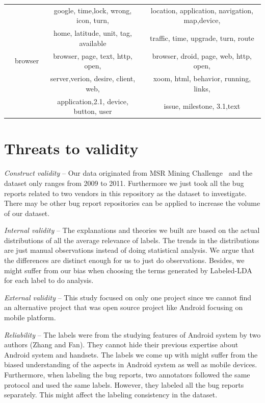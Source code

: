 \documentclass[10pt, conference, compsocconf]{IEEEtran}
\begin{document}
\begin{table}[!htb]
\begin{tabular}{|c||c||c||c|}
&&google, time,lock, wrong, icon, turn, & location, application, navigation, map,device, \\

&&home, latitude, unit, tag, available & traffic, time, upgrade, turn, route\\ \cline{2-4}

    &browser& browser, page, text, http, open, & browser, droid, page, web, http, open, \\
    &&server,verion, desire, client, web, & xoom, html, behavior, running, links, \\
&& application,2.1, device, button, user  & issue, milestone, 3.1,text \\
\hline
\end{tabular}
\end{table}

\section{Threats to validity}
\label{sec:threats}

\textit{Construct validity} – Our data originated from MSR Mining
Challenge~\cite{MSRChallenge2012} and the dataset only ranges from
2009 to 2011. Furthermore we just took all the bug reports related to
two vendors in this repository as the dataset to investigate. There
may be other bug report repositories can be applied to increase the
volume of our dataset.

\textit{Internal validity} – The explanations and theories we built
are based on the actual distributions of all the average relevance of
labels. The trends in the distributions are just manual observations
instead of doing statistical analysis. We argue that the differences
are distinct enough for us to just do observations. Besides, we might
suffer from our bias when choosing the terms generated by Labeled-LDA
for each label to do analysis.

\textit{External validity} – This study focused on only one project
since we cannot find an alternative project that was open source
project like Android focusing on mobile platform.

\textit{Reliability} – The labels were from the studying features of
Android system by two authors (Zhang and Fan). They cannot hide their
previous expertise about Android system and handsets. The labels we
come up with might suffer from the biased understanding of the aspects
in Android system as well as mobile devices. Furthermore, when
labeling the bug reports, two annotators followed the same protocol
and used the same labels. However, they labeled all the bug reports
separately. This might affect the labeling consistency in the dataset.
\end{document}
